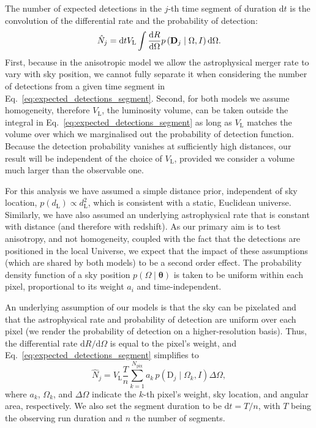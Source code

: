 \documentclass[usenatbib,useAMS]{mnras}
\newcommand{\Npix}{\ensuremath{N_\mathrm{pix}}}
\newcommand{\dL}{\ensuremath{d_\mathrm{L}}}
\begin{document}
The number of expected detections in the $j$-th time segment of duration
$\mathrm{d}t$ is the convolution of the differential rate and the probability
of detection:
%
\begin{equation}\label{eq:expected_detections_segment}
    \hat{N}_j = \mathrm{d}t V_\mathrm{L}
    \int
    \dv{R}{\Omega}
    p\left(\bm{\mathrm{D}}_j \mid \Omega,I\right)
    \mathrm{d}\Omega.
\end{equation}
%
First, because in the anisotropic model we allow the astrophysical merger rate
to vary with sky position, we cannot fully separate it when considering
the number of detections from a given time segment in
Eq.~\eqref{eq:expected_detections_segment}.
Second, for both models we assume homogeneity, therefore $V_{\mathrm{L}}$,
the luminosity volume, can be taken outside the integral in
Eq.~\eqref{eq:expected_detections_segment} as long as
$V_{\mathrm{L}}$ matches the volume over which we marginalised out the
probability of detection function. Because the detection probability
vanishes at sufficiently high distances, our result will be independent of the
choice of $V_{\mathrm{L}}$, provided we consider a volume much larger than the
observable one.

For this analysis we have assumed a simple distance prior, independent of sky
location, $p\left(\dL\right) \propto d_{\text{L}}^{2}$, which is consistent
with a static, Euclidean universe. Similarly, we have also assumed an
underlying astrophysical rate that is constant with distance (and therefore
with redshift). As our primary aim is to test anisotropy, and not homogeneity,
coupled with the fact that the detections are positioned in the local Universe,
we expect that the impact of these assumptions (which are shared by both models)
to be a second order effect. The probability density function of a
sky position $p\left(\Omega \mid \bm{\theta}\right)$ is taken to be uniform
within each pixel, proportional to its weight $a_i$ and time-independent.

An underlying assumption of our models is that the sky can be pixelated
and that the astrophysical rate and probability of detection are uniform over
each pixel (we render the probability of detection on a higher-resolution
basis). Thus, the differential rate $\mathrm{d}R/\mathrm{d}\Omega$
is equal to the pixel's weight, and
Eq.~\eqref{eq:expected_detections_segment} simplifies to
%
\begin{equation}
    \hat{N}_j = V_{\mathrm{L}}\frac{T}{n}
    \sum_{k=1}^{\Npix} a_k\,
    p\left(\bm{\mathrm{D}}_j \mid \Omega_k, I \right)
    \Delta\Omega,
\end{equation}
%
where $a_k$, $\Omega_k$, and $\Delta\Omega$ indicate the $k$-th pixel's weight,
sky location, and angular area, respectively.
We also set the segment duration to be $\mathrm{d}t = T/n$, with $T$ being
the observing run duration and $n$ the number of segments. 
\end{document}

